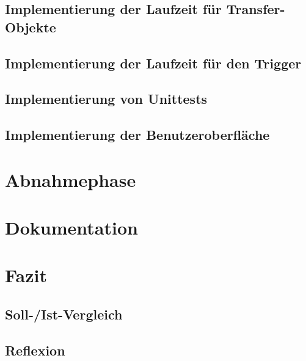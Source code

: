 \documentclass[ngerman,11pt,a4paper,titlepage]{article}
\begin{document}
		\subsection{Implementierung der Laufzeit für Transfer-Objekte}
		\label{subsec:implementierunglaufzeittransfer}
		\implementierunglaufzeittransferText
		
		\subsection{Implementierung der Laufzeit für den Trigger}
		\label{subsec:implementierunglaufzeittrigger}
		\implementierunglaufzeittriggerText
		
		\subsection{Implementierung von Unittests}
		\label{subsec:implementierungunittests}
		\implementierungunittestsText
		
		\subsection{Implementierung der Benutzeroberfläche}
		\label{subsec:implementierungbenuzteroberflaeche}
		\implementierungbenuzteroberflaecheText
	\pagebreak
	
	\section{Abnahmephase}
	\label{sec
	}
	\abnahmephaseText
	\pagebreak
	
	\section{Dokumentation}
	\label{sec
	}
	\dokumentationText
	\pagebreak
	
	\section{Fazit}
	\label{sec
	}
	\fazitText
		\subsection{Soll-/Ist-Vergleich}
		\label{subsec:sollistvergleich}
		\sollistvergleichText
		
		\subsection{Reflexion}
		\label{subsec:reflexion}
		
\end{document}

